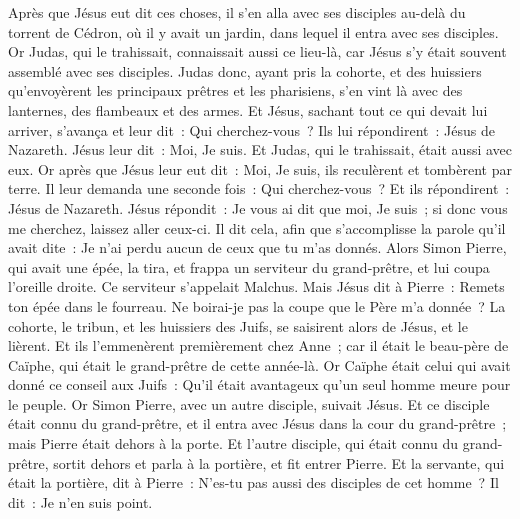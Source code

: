 \begin{multicols}{2}
\VerseOne{}Après que Jésus eut dit ces choses, il s'en alla avec ses disciples au-delà du torrent de Cédron, où il y avait un jardin, dans lequel il entra avec ses disciples.
Or Judas, qui le trahissait, connaissait aussi ce lieu-là, car Jésus s'y était souvent assemblé avec ses disciples.
Judas donc, ayant pris la cohorte, et des huissiers qu'envoyèrent les principaux prêtres et les pharisiens, s'en vint là avec des lanternes, des flambeaux et des armes.
Et Jésus, sachant tout ce qui devait lui arriver, s'avança et leur dit~: Qui cherchez-vous~?
Ils lui répondirent~: Jésus de Nazareth. Jésus leur dit~: Moi, Je suis. Et Judas, qui le trahissait, était aussi avec eux.
Or après que Jésus leur eut dit~: Moi, Je suis, ils reculèrent et tombèrent par terre.
Il leur demanda une seconde fois~: Qui cherchez-vous~? Et ils répondirent~: Jésus de Nazareth.
Jésus répondit~: Je vous ai dit que moi, Je suis~; si donc vous me cherchez, laissez aller ceux-ci.
Il dit cela, afin que s'accomplisse la parole qu'il avait dite~: Je n'ai perdu aucun de ceux que tu m'as donnés.
Alors Simon Pierre, qui avait une épée, la tira, et frappa un serviteur du grand-prêtre, et lui coupa l'oreille droite. Ce serviteur s'appelait Malchus.
Mais Jésus dit à Pierre~: Remets ton épée dans le fourreau. Ne boirai-je pas la coupe que le Père m'a donnée~?
La cohorte, le tribun, et les huissiers des Juifs, se saisirent alors de Jésus, et le lièrent.
Et ils l'emmenèrent premièrement chez Anne~; car il était le beau-père de Caïphe, qui était le grand-prêtre de cette année-là.
Or Caïphe était celui qui avait donné ce conseil aux Juifs~: Qu'il était avantageux qu'un seul homme meure pour le peuple.
Or Simon Pierre, avec un autre disciple, suivait Jésus. Et ce disciple était connu du grand-prêtre, et il entra avec Jésus dans la cour du grand-prêtre~;
mais Pierre était dehors à la porte. Et l'autre disciple, qui était connu du grand-prêtre, sortit dehors et parla à la portière, et fit entrer Pierre.
Et la servante, qui était la portière, dit à Pierre~: N'es-tu pas aussi des disciples de cet homme~? Il dit~: Je n'en suis point.

\end{multicols}
